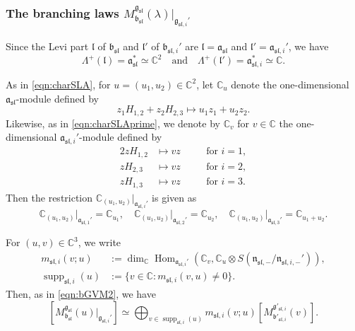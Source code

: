 \documentclass[a4paper,11pt,reqno]{amsart}
\newcommand{\fraka}{\mathfrak{a}}
\newcommand{\frakg}{\mathfrak{g}}
\newcommand{\frakn}{\mathfrak{n}}
\newcommand{\CC}{\mathbb{C}}
\newcommand{\0}{{\bf 0}}
\newcommand{\C}{\mathbb{C}}
\newcommand{\1}{{\bf 1}}
\DeclareMathOperator{\Hom}{Hom}
\newcommand{\frakb}{{\mathfrak b}}
\newcommand{\frakl}{{\mathfrak l}}
\DeclareMathOperator{\supp}{supp}
\newcommand{\fraksl}{{\mathfrak{sl}}}
\newcommand{\Mbsl}{M^{\frakg_{\fraksl}}_{\frakb_{\fraksl}}}
\theoremstyle{plain}
\theoremstyle{definition}
\numberwithin{equation}{section}
\theoremstyle{definition}
\begin{document}
\subsubsection{The branching laws \texorpdfstring{$\Mbsl(\lambda)\vert_{\frakg_{\fraksl,i}'}$}{M(λ)|_{g_{sl,i}}}}
\label{sec:BranchingLaw_SL}

Since the Levi part $\frakl$ of $\frakb_{\fraksl}$ and 
$\frakl'$ of $\frakb_{\fraksl,i}'$
are $\frakl=\fraka_{\fraksl}$ and 
$\frakl'=\fraka_{\fraksl,i}'$, we have 
\begin{equation*}
\Lambda^+(\frakl) = \fraka_{\fraksl}^* \simeq \CC^2
\quad
\text{and}
\quad
\Lambda^+(\frakl') = \fraka_{\fraksl,i}^* \simeq \CC.
\end{equation*}

\vspace{10pt}

As in \eqref{eqn:charSLA},
for $u=(u_1,u_2) \in \C^2$,
let $\C_{u}$ denote  the one-dimensional $\fraka_{\fraksl}$-module 
defined by
\begin{equation*}
z_1 H_{1,2} + z_2 H_{2,3}  
\longmapsto 
u_1z_1  + u_2z_2.
\end{equation*}
Likewise, as in \eqref{eqn:charSLAprime}, we denote by
$\C_{v}$ for $v\in \C$
the one-dimensional $\fraka_{\fraksl,i}'$-module defined by
\begin{alignat*}{2}
z H_{1,2}  &\longmapsto vz  &&\quad \text{for $i=1$},\\[3pt]
z H_{2,3}  &\longmapsto vz  &&\quad \text{for $i=2$},\\[3pt]
z H_{1,3}  &\longmapsto vz  &&\quad \text{for $i=3$}.
\end{alignat*}
Then the restriction $\C_{(u_1,u_2)}\vert_{\fraka_{\fraksl,i}'}$ is given as
\begin{equation}\label{eqn:restriction_to_ai2}
\C_{(u_1, u_2)}\vert_{\fraka_{\fraksl,1}'} = \C_{u_1},
\quad
\C_{(u_1, u_2)}\vert_{\fraka_{\fraksl,2}'} = \C_{u_2},
\quad
\C_{(u_1, u_2)}\vert_{\fraka_{\fraksl,3}'} = \C_{u_1+u_2}.
\end{equation}

For $(u,v) \in \C^3$, we write
\begin{align}
m_{\fraksl,i}(v;u)&:=
\dim_\CC \Hom_{\fraka_{\fraksl,i}'}(\C_v, \C_u \otimes 
S(\frakn_{\fraksl,-}/\frakn_{\fraksl, i,-}')),\label{eqn:mult_i_sl}\\[3pt]
\supp_{\fraksl,i}(u)&:=\{v \in \CC : m_{\fraksl,i}(v,u)\neq 0\}.\nonumber
\end{align}
Then, as in \eqref{eqn:bGVM2}, we have 
\begin{equation}\label{eqn:bGVM_SL2}
[\Mbsl(u)\vert_{\frakg_{\fraksl,i}'}]
\simeq 
\bigoplus_{v \in \supp_{\fraksl,i}(u)}
m_{\fraksl,i}(v; u) 
[M^{\frakg'_{\fraksl,i}}_{\frakb'_{\fraksl,i}}(v)].
\end{equation}
\end{document}
